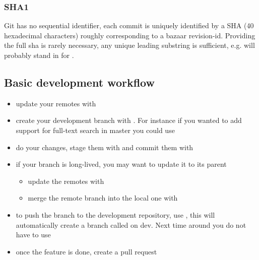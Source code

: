 \documentclass[a4paper,10pt,french]{sphinxmanual}
\begin{document}
\subsubsection{SHA1}
\label{\detokenize{docs/tuts/autocad-tut01:sha1}}
Git has no sequential identifier, each commit is uniquely identified by a SHA
(40 hexadecimal characters) roughly corresponding to a bazaar
revision-id. Providing the full sha is rarely necessary, any unique leading
substring is sufficient, e.g.  will probably stand in for
.


\subsection{Basic development workflow}
\label{\detokenize{docs/tuts/autocad-tut01:basic-development-workflow}}\begin{itemize}
\item {} 
update your remotes with 

\item {} 
create your development branch with . For instance if you wanted to add support for full-text
search in master you could use 

\item {} 
do your changes, stage them with  and commit them with 

\item {} 
if your branch is long-lived, you may want to update it to its parent
\begin{itemize}
\item {} 
update the remotes with 

\item {} 
merge the remote branch into the local one with 

\end{itemize}

\item {} 
to push the branch to the development repository, use , this will automatically create a branch called
 on dev. Next time around you do not have to use 

\item {} 
once the feature is done, create a pull request

\end{itemize}
\end{document}
